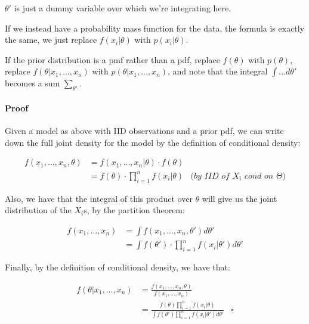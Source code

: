 \documentclass[a4paper]{article}
\begin{document}
                $\theta'$ is just a dummy variable over which we're integrating
                here.

                If we instead have a probability mass function for the data, the
                formula is exactly the same, we just replace $f(x_i | \theta)$
                with $p(x_i | \theta)$.

                If the prior distribution is a pmf rather than a pdf, replace
                $f(\theta)$ with $p(\theta)$, replace $f(\theta | x_1, ...,
                x_n)$ with $p(\theta | x_1, ..., x_n)$, and note that the
                integral $\int ... d\theta'$ becomes a sum
                $\sum\limits_{\theta'}$.

                \paragraph{Proof}
                    Given a model as above with IID observations and a prior
                    pdf, we can write down the full joint density for the model
                    by the definition of conditional density:

                    \begin{align*}
                        f(x_1, ..., x_n, \theta) & = f(x_1, ..., x_n | \theta)
                            \cdot f(\theta) \\
                        & = f(\theta) \cdot \prod_{i=1}^n f(x_i | \theta) &
                            \textit{(by IID of $X_i$ cond on $\Theta$)}
                    \end{align*}

                    Also, we have that the integral of this product over
                    $\theta$ will give us the joint distribution of the $X_i$s,
                    by the partition theorem:

                    \begin{align*}
                        f(x_1, ..., x_n) & = \int f(x_1, ..., x_n, \theta') d
                            \theta' \\
                        & = \int f(\theta') \cdot \prod_{i=1}^n f(x_i | \theta')
                            d\theta'
                    \end{align*}

                    Finally, by the definition of conditional density, we have
                    that:

                    \begin{align*}
                        f(\theta | x_1, ..., x_n) & = \frac{f(x_1, ..., x_n,
                            \theta)}{f(x_1, ..., x_n)} \\
                        & = \frac{f(\theta) \prod\limits_{i=1}^n f(x_i |
                            \theta)}{\int f(\theta ') \prod\limits_{i=1}^n f(x_i
                            | \theta') d\theta'} & \square
                    \end{align*}
\end{document}
